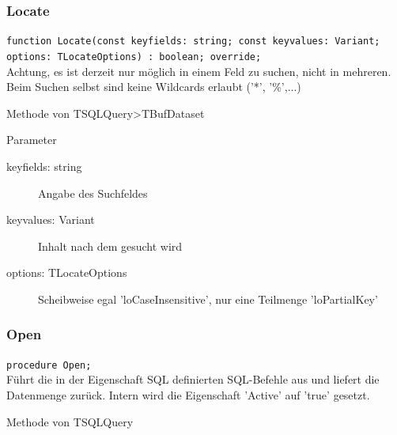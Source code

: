 \subsubsection{Locate}
\begin{description}
  \item \texttt{function Locate(const keyfields: string; const keyvalues: Variant; options: TLocateOptions) : boolean; override;}\\ Achtung, es ist derzeit nur möglich in einem Feld zu suchen, nicht in mehreren. Beim Suchen selbst sind keine Wildcards erlaubt ('*', '\%',...)
  \begin{description}
    \item Methode von TSQLQuery>TBufDataset
  \end{description}
  \begin{description}
    \item Parameter
    \begin{description}
      \item[keyfields: string] Angabe des Suchfeldes
      \item[keyvalues: Variant] Inhalt nach dem gesucht wird
      \item[options: TLocateOptions] Scheibweise egal 'loCaseInsensitive', nur eine Teilmenge 'loPartialKey'
    \end{description}
  \end{description}
\end{description}

\subsubsection{Open}
\begin{description}
  \item \texttt{procedure Open;}\\
Führt die in der Eigenschaft SQL definierten SQL-Befehle aus und liefert die Datenmenge zurück. Intern wird die Eigenschaft 'Active' auf 'true' gesetzt.
  \begin{description}
    \item Methode von TSQLQuery
  \end{description}
\end{description}

